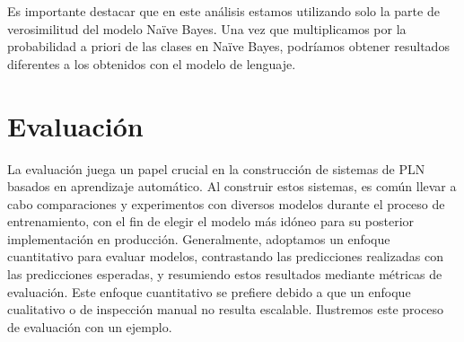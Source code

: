 Es importante destacar que en este análisis estamos utilizando solo la parte de verosimilitud del modelo Naïve Bayes. Una vez que multiplicamos por la probabilidad a priori de las clases en Naïve Bayes, podríamos obtener resultados diferentes a los obtenidos con el modelo de lenguaje.



\section{Evaluación}

La evaluación juega un papel crucial en la construcción de sistemas de PLN basados en aprendizaje automático. Al construir estos sistemas, es común llevar a cabo comparaciones y experimentos con diversos modelos durante el proceso de entrenamiento, con el fin de elegir el modelo más idóneo para su posterior implementación en producción. Generalmente, adoptamos un enfoque cuantitativo para evaluar modelos, contrastando las predicciones realizadas con las predicciones esperadas, y resumiendo estos resultados mediante métricas de evaluación. Este enfoque cuantitativo se prefiere debido a que un enfoque cualitativo o de inspección manual no resulta escalable. Ilustremos este proceso de evaluación con un ejemplo.


